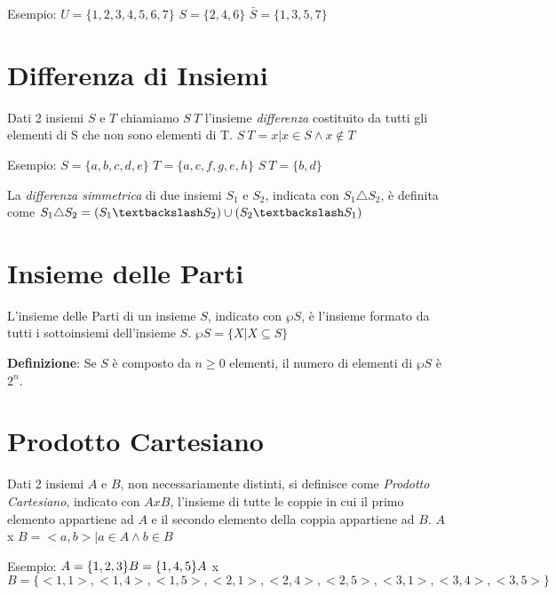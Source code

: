 Esempio: \newline
$U = \{1,2,3,4,5,6,7\} $\newline
$S = \{2,4,6\} $ \newline
$\bar{S} = \{1,3,5,7\} $


\section{Differenza di Insiemi}
Dati 2 insiemi $S$ e $T$ chiamiamo $S \ T$ l'insieme \textit{differenza} costituito
da tutti gli elementi di S che non sono elementi di T. \newline
$S \ T = {x | x \in S \land x \not \in T} $

Esempio: \newline
$S = \{a,b,c,d,e\}$ \quad $T = \{a,c,f,g,e,h\}$\newline
$S \ T = \{b,d\}$

La \textit{differenza simmetrica} di due insiemi $S_1$ e $S_2$, indicata con $S_1 \triangle S_2$,
è definita come $S_1 \triangle S_2 = (S_1 \textbackslash S_2) \cup (S_2 \textbackslash S_1) $


\section{Insieme delle Parti}
L'insieme delle Parti di un insieme $S$, indicato con $\wp S$, è l'insieme formato
da tutti i sottoinsiemi dell'insieme $S$. \newline
$\wp S = \{X | X \subseteq S\} $

\textbf{Definizione}: Se $S$ è composto da $n \geq 0$ elementi, il numero di elementi
di $\wp S$ è $2 ^ n$.


\section{Prodotto Cartesiano}
Dati 2 insiemi $A$ e $B$, non necessariamente  distinti, si definisce come \textit{Prodotto Cartesiano},
indicato con $A x B$, l'insieme di tutte le coppie in cui il primo elemento appartiene ad $A$
e il secondo elemento della coppia appartiene ad $B$.\newline
$A$ x $B = {<a,b> | a \in A \land b \in B} $

Esempio:\newline
$A = \{1,2,3\} \newline
B = \{1,4,5\} \newline
A$ x $B = \{<1,1>,<1,4>,<1,5>,<2,1>,<2,4>,<2,5>,<3,1>,<3,4>,<3,5>\} $
